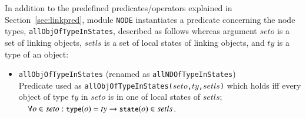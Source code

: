 \documentclass[12pt]{report}
\newcommand{\ra}{\rightarrow}
\newcommand{\mbstt}[1]{\mbox{\small{\tt {#1}}}}
\newcommand{\stt}[1]{{\small{\tt {#1}}}}
\begin{document}
In addition to the predefined predicates/operators explained in
Section~\ref{sec:linkpred}, module {\tt NODE} instantiates a predicate
concerning the node types, {\tt allObjOfTypeInStates}, described as
follows whereas argument $seto$ is a set of linking objects, $setls$
is a set of local states of linking objects, and $ty$ is a type of an
object:
\begin{itemize}
\item \stt{allObjOfTypeInStates} (renamed as \stt{allNDOfTypeInStates})\\
  Predicate used as \stt{allObjOfTypeInStates($seto$,$ty$,$setls$)}
  which holds iff every object of type $ty$ in $seto$ is in one of
  local states of $setls$;\\$~~~~\forall o\in
  seto:\mbstt{type}(o)=ty\ra\mbstt{state}(o)\in setls$.
\end{itemize}
\end{document}

